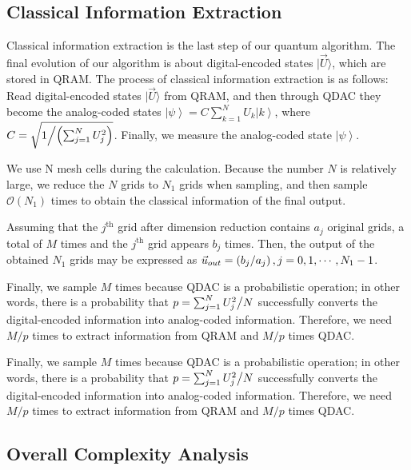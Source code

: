 \documentclass[%
 reprint,
 amsmath,amssymb,
pra,
]{revtex4-1}
\begin{document}
\subsection{Classical Information Extraction}
Classical information extraction is the last step of our quantum algorithm. The final evolution of our algorithm is about digital-encoded states $|\vec{U}\rangle$, which are stored in QRAM. The process of classical information extraction is as follows: Read digital-encoded states $|\vec{U}\rangle$ from QRAM, and then through QDAC they become the analog-coded states $\left| \psi \right\rangle = C\sum\limits_{k = 1}^N {{U_k}\left| k \right\rangle}$, where $C = \sqrt{{1 \mathord{\left/{\vphantom {1 {\left( {\sum\nolimits_{j = 1}^N {U_j^2} } \right)}}} \right. \kern-\nulldelimiterspace}{\left( {\sum\nolimits_{j = 1}^N {U_j^2} } \right)}}}$. Finally, we measure the analog-coded state $\left| \psi \right\rangle $.

We use N mesh cells during the calculation. Because the number $N$ is relatively large, we reduce the $N$ grids to $N_1$ grids when sampling, and then sample $\mathcal{O}(N_1)$ times to obtain the classical information of the final output.

Assuming that the $j^{\text{th}}$ grid after dimension reduction contains $a_j$ original grids, a total of $M$ times and the $j^{\text{th}}$ grid appears $b_j$ times. Then, the output of the obtained $N_1$ grids may be expressed as ${\vec u_{out}} = \left( {{{{b_j}} \mathord{\left/ {\vphantom {{{b_j}} {{a_j}}}} \right. \kern-\nulldelimiterspace} {{a_j}}}} \right),j = 0,1, \cdots ,{N_1} - 1$.

Finally, we sample $M$ times because QDAC is a probabilistic operation; in other words, there is a probability that $p = \sum\nolimits_{j = 1}^N {{{U_j^2} \mathord{\left/{\vphantom {{U_j^2} N}} \right. \kern-\nulldelimiterspace} N}} $ successfully converts the digital-encoded information into analog-coded information. Therefore, we need $M/p$ times to extract information from QRAM and $M/p$ times QDAC.

Finally, we sample $M$ times because QDAC is a probabilistic operation; in other words, there is a probability that $p = \sum\nolimits_{j = 1}^N {{{U_j^2} \mathord{\left/{\vphantom {{U_j^2} N}} \right. \kern-\nulldelimiterspace} N}} $ successfully converts the digital-encoded information into analog-coded information. Therefore, we need $M/p$ times to extract information from QRAM and $M/p$ times QDAC.
\subsection{Overall Complexity Analysis}
\end{document}
